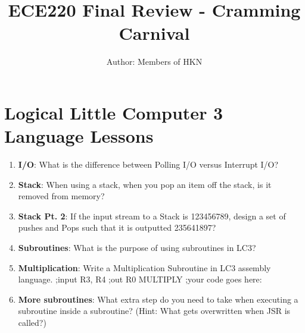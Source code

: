 \documentclass{article}
\title{ECE220 Final Review - Cramming Carnival}
\author{Author: Members of HKN}
\date{}
\begin{document}
\maketitle

\section{
Logical Little Computer 3 Language Lessons}
\begin{enumerate}[label=(\alph*), itemsep = 120pt]
    \item \textbf{I/O}: What is the difference between Polling I/O versus Interrupt I/O?
    

    \item \textbf{Stack}: When using a stack, when you pop an item off the stack, is it removed from memory?

    
    \item \textbf{Stack Pt. 2}: If the input stream to a Stack is 123456789, design a set of pushes and Pops such that it is outputted 235641897?
    
    \item \textbf{Subroutines}: What is the purpose of using subroutines in LC3?
    
    \item \textbf{Multiplication}: Write a Multiplication Subroutine in LC3 assembly language.
    \newline
    ;input R3, R4 \newline
    ;out R0 \newline
    MULTIPLY \newline
    ;your code goes here: \newline
    \newpage

    
     \item 
    \textbf{More subroutines}: What extra step do you need to take when executing a subroutine inside a subroutine? (Hint: What gets overwritten when JSR is called?)
    
    \end{enumerate}

   

\newpage
\end{document}
